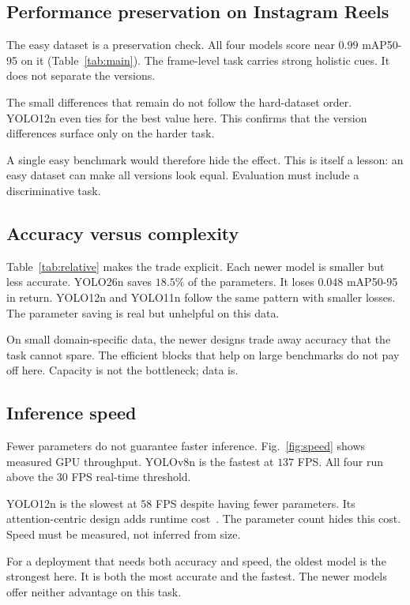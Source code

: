 \documentclass[conference]{IEEEtran}
\begin{document}
\subsection{Performance preservation on Instagram Reels}
The easy dataset is a preservation check. All four models score near $0.99$
mAP50-95 on it (Table~\ref{tab:main}). The frame-level task carries strong
holistic cues. It does not separate the versions.

The small differences that remain do not follow the hard-dataset order. YOLO12n
even ties for the best value here. This confirms that the version differences
surface only on the harder task.

A single easy benchmark would therefore hide the effect. This is itself a
lesson: an easy dataset can make all versions look equal. Evaluation must
include a discriminative task.

\subsection{Accuracy versus complexity}
Table~\ref{tab:relative} makes the trade explicit. Each newer model is smaller
but less accurate. YOLO26n saves $18.5\%$ of the parameters. It loses $0.048$
mAP50-95 in return. YOLO12n and YOLO11n follow the same pattern with smaller
losses. The parameter saving is real but unhelpful on this data.

On small domain-specific data, the newer designs trade away accuracy that the
task cannot spare. The efficient blocks that help on large benchmarks do not
pay off here. Capacity is not the bottleneck; data is.



\subsection{Inference speed}
Fewer parameters do not guarantee faster inference.
Fig.~\ref{fig:speed} shows measured GPU throughput. YOLOv8n is the fastest at
$137$ FPS. All four run above the $30$ FPS real-time threshold.

YOLO12n is the slowest at $58$ FPS despite having fewer parameters. Its
attention-centric design adds runtime cost~\cite{tian2025yolov12}. The
parameter count hides this cost. Speed must be measured, not inferred from size.

For a deployment that needs both accuracy and speed, the oldest model is the
strongest here. It is both the most accurate and the fastest. The newer models
offer neither advantage on this task.
\end{document}
